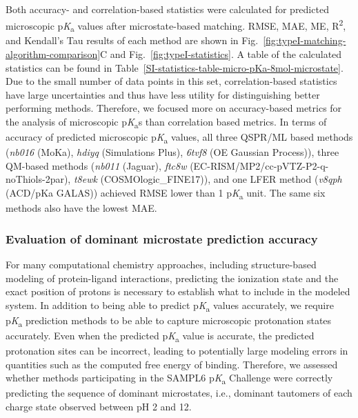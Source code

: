 \documentclass[9pt,lineno,final]{elife}
\newcommand{\pKa}{p\textit{K}\textsubscript{a}}
\begin{document}
Both accuracy- and correlation-based statistics were calculated for predicted microscopic \pKa{} values after microstate-based matching. 
RMSE, MAE, ME, R\textsuperscript{2}, and Kendall's Tau results of each method are shown in Fig.~\ref{fig:typeI-matching-algorithm-comparison}C and Fig.~\ref{fig:typeI-statistics}. 
A table of the calculated statistics can be found in Table~\ref{SI-statistics-table-micro-pKa-8mol-microstate}. 
Due to the small number of data points in this set, correlation-based statistics have large uncertainties and thus have less utility for distinguishing better performing methods. 
Therefore, we focused more on accuracy-based metrics for the analysis of microscopic \pKa{}s than correlation based metrics. 
In terms of accuracy of predicted microscopic \pKa{} values, all three QSPR/ML based methods (\textit{nb016} (MoKa), \textit{hdiyq} (Simulations Plus), \textit{6tvf8} (OE Gaussian Process)), three QM-based methods (\textit{nb011} (Jaguar), \textit{ftc8w} (EC-RISM/MP2/cc-pVTZ-P2-q-noThiols-2par), \textit{t8ewk} (COSMOlogic\_FINE17)), and one LFER method (\textit{v8qph} (ACD/pKa GALAS)) achieved RMSE lower than 1 \pKa{} unit. 
The same six methods also have the lowest MAE.


\subsubsection{Evaluation of dominant microstate prediction accuracy}

For many computational chemistry approaches, including structure-based modeling of protein-ligand interactions, predicting the ionization state and the exact position of protons is necessary to establish what to include in the modeled system.  
In addition to being able to predict \pKa{} values accurately, we require \pKa{} prediction methods to be able to capture microscopic protonation states accurately. 
Even when the predicted \pKa{} value is accurate, the predicted protonation sites can be incorrect, leading to potentially large modeling errors in quantities such as the computed free energy of binding. 
Therefore, we assessed whether methods participating in the SAMPL6 \pKa{} Challenge were correctly predicting the sequence of dominant microstates, i.e., dominant tautomers of each charge state observed between pH 2 and 12.
\end{document}
